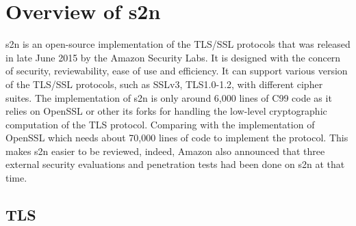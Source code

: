 

\section{Overview of s2n}
s2n \cite{3_the_s2n_user_manual, 4_introducing_s2n} is an open-source implementation of the TLS/SSL protocols that was released in late June 2015 by the Amazon Security Labs. It is designed with the concern of security, reviewability, ease of use and efficiency. It can support various version of the TLS/SSL protocols, such as SSLv3, TLS1.0-1.2, with different cipher suites. The implementation of s2n is only around 6,000 lines of C99 code as it relies on OpenSSL or other its forks for handling the low-level cryptographic computation of the TLS protocol. Comparing with the implementation of OpenSSL which needs about 70,000 lines of code to implement the protocol. This makes s2n easier to be reviewed, indeed, Amazon also announced that three external security evaluations and penetration tests had been done on s2n at that time. 


\subsection{TLS}

